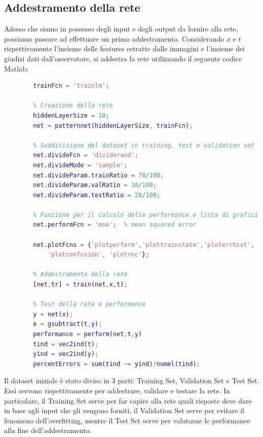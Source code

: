 \documentclass[a4paper,11pt]{article}
\begin{document}
    \subsection{Addestramento della rete}
    Adesso che siamo in possesso degli input e degli output da fornire alla rete, possiamo passare ad effettuare un primo addestramento.
    Considerando $x$ e $t$ rispettivamente l'insieme delle features estratte dalle immagini e l'insieme dei giudizi dati dall'osservatore, si addestra la rete
    utilizzando il seguente codice Matlab:
    \begin{lstlisting}[language=Matlab]        
        % Funzione di training
        trainFcn = 'trainlm';  
        
        % Creazione della rete
        hiddenLayerSize = 10;
        net = patternnet(hiddenLayerSize, trainFcn);
        
        % Suddivisione del dataset in training, test e validation set
        net.divideFcn = 'dividerand'; 
        net.divideMode = 'sample'; 
        net.divideParam.trainRatio = 70/100;
        net.divideParam.valRatio = 10/100;
        net.divideParam.testRatio = 20/100;
        
        % Funzione per il calcolo delle performance e lista di grafici da generare
        net.performFcn = 'mse';  % mean squared error
        
        net.plotFcns = {'plotperform','plottrainstate','ploterrhist', ...
            'plotconfusion', 'plotroc'};
        
        % Addestramento della rete
        [net,tr] = train(net,x,t);
        
        % Test della rete e performance
        y = net(x);
        e = gsubtract(t,y);
        performance = perform(net,t,y)
        tind = vec2ind(t);
        yind = vec2ind(y);
        percentErrors = sum(tind ~= yind)/numel(tind);
    \end{lstlisting}
    Il dataset iniziale è stato diviso in 3 parti: Training Set, Validation Set e Test Set. Essi servono rispettivamente per addestrare, validare e testare la rete.
    In particolare, il Training Set serve per far capire alla rete quali risposte deve dare in base agli input che gli vengono forniti, il Validation Set serve per evitare il fenomeno dell'overfitting, mentre il Test Set serve per valutarne le performance alla fine dell'addestramento.
    \newpage
\end{document}
